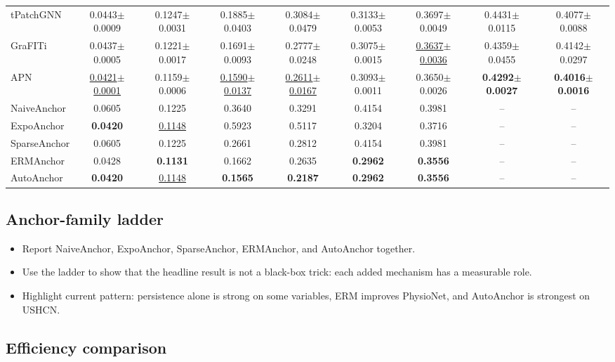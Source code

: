 \documentclass{article}
\newcommand{\method}{AutoAnchor}
\newcommand{\best}[1]{\textbf{#1}}
\newcommand{\second}[1]{\underline{#1}}
\begin{document}
\begin{table}[t]
{\begin{tabular}{lcccccccc}
tPatchGNN & 0.0443$\pm$0.0009 & 0.1247$\pm$0.0031 & 0.1885$\pm$0.0403 & 0.3084$\pm$0.0479 & 0.3133$\pm$0.0053 & 0.3697$\pm$0.0049 & 0.4431$\pm$0.0115 & 0.4077$\pm$0.0088 \\
GraFITi & 0.0437$\pm$0.0005 & 0.1221$\pm$0.0017 & 0.1691$\pm$0.0093 & 0.2777$\pm$0.0248 & 0.3075$\pm$0.0015 & \second{0.3637$\pm$0.0036} & 0.4359$\pm$0.0455 & 0.4142$\pm$0.0297 \\
APN & \second{0.0421$\pm$0.0001} & 0.1159$\pm$0.0006 & \second{0.1590$\pm$0.0137} & \second{0.2611$\pm$0.0167} & 0.3093$\pm$0.0011 & 0.3650$\pm$0.0026 & \best{0.4292$\pm$0.0027} & \best{0.4016$\pm$0.0016} \\
\midrule
NaiveAnchor & 0.0605 & 0.1225 & 0.3640 & 0.3291 & 0.4154 & 0.3981 & -- & -- \\
ExpoAnchor & \best{0.0420} & \second{0.1148} & 0.5923 & 0.5117 & 0.3204 & 0.3716 & -- & -- \\
SparseAnchor & 0.0605 & 0.1225 & 0.2661 & 0.2812 & 0.4154 & 0.3981 & -- & -- \\
ERMAnchor & 0.0428 & \best{0.1131} & 0.1662 & 0.2635 & \best{0.2962} & \best{0.3556} & -- & -- \\
\method{} & \best{0.0420} & \second{0.1148} & \best{0.1565} & \best{0.2187} & \best{0.2962} & \best{0.3556} & -- & -- \\
\bottomrule
\end{tabular}
}
\end{table}

\subsection{Anchor-family ladder}

\begin{itemize}
    \item Report NaiveAnchor, ExpoAnchor, SparseAnchor, ERMAnchor, and
    \method{} together.
    \item Use the ladder to show that the headline result is not a black-box
    trick: each added mechanism has a measurable role.
    \item Highlight current pattern: persistence alone is strong on some
    variables, ERM improves PhysioNet, and \method{} is strongest on USHCN.
\end{itemize}

\subsection{Efficiency comparison}
\end{document}
